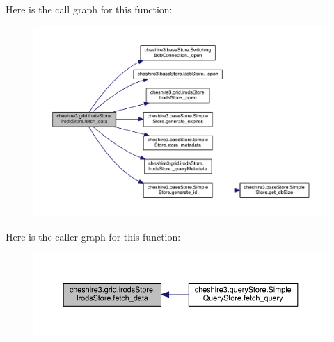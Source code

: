 Here is the call graph for this function\-:
\nopagebreak
\begin{figure}[H]
\begin{center}
\leavevmode
\includegraphics[width=350pt]{classcheshire3_1_1grid_1_1irods_store_1_1_irods_store_ad41c2521d849cbc62cf5a0ad6c1e05c2_cgraph}
\end{center}
\end{figure}




Here is the caller graph for this function\-:
\nopagebreak
\begin{figure}[H]
\begin{center}
\leavevmode
\includegraphics[width=350pt]{classcheshire3_1_1grid_1_1irods_store_1_1_irods_store_ad41c2521d849cbc62cf5a0ad6c1e05c2_icgraph}
\end{center}
\end{figure}


